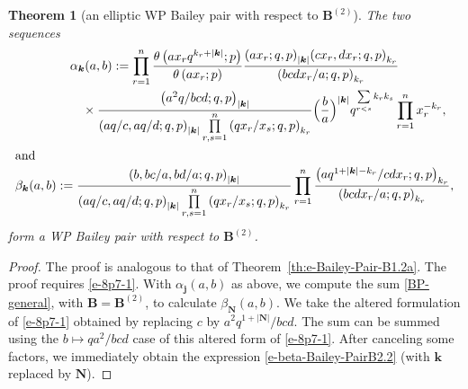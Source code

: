 \documentclass[pdftex]{sigma}
\numberwithin{equation}{section}
\newtheorem{Theorem}{Theorem}[section]
\newcommand{\sumN}{{\left| \boldsymbol{N} \right|}}
\newcommand\sumk{{\left| \boldsymbol{k} \right|}}
\newcommand{\B}{{ \mathbf B}}
\newcommand{\N}{{ \boldsymbol N}}
\renewcommand{\k}{{ \boldsymbol{k}}}
\renewcommand{\j}{{ \boldsymbol{j}}}
\newcommand{\sqprod}[1]{\prod\limits_{r, s =1}^{#1}} %
\newcommand{\smallprod}[1]{\prod\limits_{r =1}^{#1}} %
\newcommand{\xover}[1]{#1_{r}/#1_{s}}
\newcommand{\ellipticqrfac}[2]{{\left({#1}; q, p\right)_{#2}}} %
\newcommand{\elliptictheta}[1]{\theta \left({#1} ; p\right) }
\begin{document}
\begin{Theorem}[an elliptic WP Bailey pair with respect to $\B^{(2)}$]\label{th:e-Bailey-Pair-B2.2}
The two sequences
\begin{subequations}
\begin{gather}
\alpha_\k(a,b) :=
\smallprod n \frac{\elliptictheta{ax_rq^{k_r+\sumk}}}{\elliptictheta{ax_r}}
\frac{\ellipticqrfac{ax_r}{\sumk} \ellipticqrfac{cx_r, dx_r}{k_r}}
{\ellipticqrfac{bcdx_r/a }{k_r} }\notag\\
\hphantom{\alpha_\k(a,b) :=}{} \times
 \frac{\ellipticqrfac{ a^2q/bcd}{\sumk} }{\ellipticqrfac{aq/c, aq/d}{\sumk}
 \sqprod n \ellipticqrfac{q\xover x}{k_r}}
 \Big(\frac{b}{a}\Big)^{\sumk}
 q^{\sum\limits_{r<s}k_r k_s}
 \smallprod n x_r^{-k_r},
 \label{e-alpha-Bailey-PairB2.2} \\
 \intertext{and}
\beta_\k(a,b) :=
\frac{\ellipticqrfac{b, bc/a, bd/a}{\sumk}}{\ellipticqrfac{aq/c, aq/d}{\sumk}
\sqprod n \ellipticqrfac{q\xover x}{k_r}}
\smallprod n \frac{\ellipticqrfac{aq^{1+\sumk-k_r}/cdx_r}{k_r}}
{\ellipticqrfac{ bcdx_r/a}{k_r}},\label{e-beta-Bailey-PairB2.2}
\end{gather}
\end{subequations}
form a WP Bailey pair with respect to $\B^{(2)}$.
\end{Theorem}
\begin{proof} The proof is analogous to that of Theorem~\ref{th:e-Bailey-Pair-B1.2a}. The proof requires \eqref{e-8p7-1}. With $\alpha_\j(a,b)$ as above, we compute the sum \eqref{BP-general}, with $\B=\B^{(2)}$, to calculate $\beta_\N(a,b)$. We take the altered formulation of \eqref{e-8p7-1} obtained by replacing $c$ by $a^2q^{1+\sumN}/bcd$. The sum can be summed using the $b\mapsto qa^2/bcd$ case of this altered form of \eqref{e-8p7-1}. After canceling some factors, we immediately obtain the expression \eqref{e-beta-Bailey-PairB2.2} (with $\k$ replaced by $\N$).
\end{proof}
\end{document}
